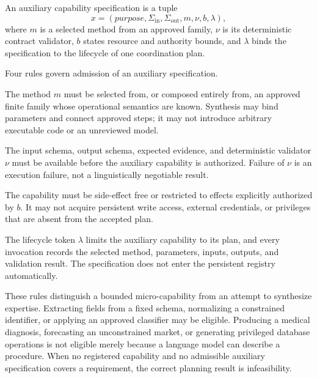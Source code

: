 \begin{definition}
\label{def:auxiliary}
An auxiliary capability specification is a tuple
\[
x = (\mathit{purpose}, \Sigma_{\mathrm{in}}, \Sigma_{\mathrm{out}}, m, \nu, b, \lambda),
\]
where $m$ is a selected method from an approved family, $\nu$ is its deterministic contract validator, $b$ states resource and authority bounds, and $\lambda$ binds the specification to the lifecycle of one coordination plan.
\end{definition}

Four rules govern admission of an auxiliary specification.

\begin{auxrule}
\label{rule:approved-construction}
The method $m$ must be selected from, or composed entirely from, an approved finite family whose operational semantics are known. Synthesis may bind parameters and connect approved steps; it may not introduce arbitrary executable code or an unreviewed model.
\end{auxrule}

\begin{auxrule}
\label{rule:contract-validation}
The input schema, output schema, expected evidence, and deterministic validator $\nu$ must be available before the auxiliary capability is authorized. Failure of $\nu$ is an execution failure, not a linguistically negotiable result.
\end{auxrule}

\begin{auxrule}
\label{rule:bounded-authority}
The capability must be side-effect free or restricted to effects explicitly authorized by $b$. It may not acquire persistent write access, external credentials, or privileges that are absent from the accepted plan.
\end{auxrule}

\begin{auxrule}
\label{rule:lifecycle}
The lifecycle token $\lambda$ limits the auxiliary capability to its plan, and every invocation records the selected method, parameters, inputs, outputs, and validation result. The specification does not enter the persistent registry automatically.
\end{auxrule}

These rules distinguish a bounded micro-capability from an attempt to synthesize expertise. Extracting fields from a fixed schema, normalizing a constrained identifier, or applying an approved classifier may be eligible. Producing a medical diagnosis, forecasting an unconstrained market, or generating privileged database operations is not eligible merely because a language model can describe a procedure. When no registered capability and no admissible auxiliary specification covers a requirement, the correct planning result is infeasibility.

